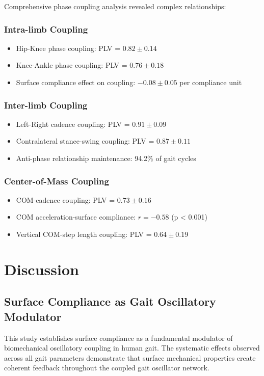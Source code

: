 \documentclass[12pt]{article}
\begin{document}
Comprehensive phase coupling analysis revealed complex relationships:

\subsubsection{Intra-limb Coupling}
\begin{itemize}
\item Hip-Knee phase coupling: PLV = $0.82 \pm 0.14$
\item Knee-Ankle phase coupling: PLV = $0.76 \pm 0.18$
\item Surface compliance effect on coupling: $-0.08 \pm 0.05$ per compliance unit
\end{itemize}

\subsubsection{Inter-limb Coupling}
\begin{itemize}
\item Left-Right cadence coupling: PLV = $0.91 \pm 0.09$
\item Contralateral stance-swing coupling: PLV = $0.87 \pm 0.11$
\item Anti-phase relationship maintenance: 94.2\% of gait cycles
\end{itemize}

\subsubsection{Center-of-Mass Coupling}
\begin{itemize}
\item COM-cadence coupling: PLV = $0.73 \pm 0.16$
\item COM acceleration-surface compliance: $r = -0.58$ (p < 0.001)
\item Vertical COM-step length coupling: PLV = $0.64 \pm 0.19$
\end{itemize}

\section{Discussion}

\subsection{Surface Compliance as Gait Oscillatory Modulator}

This study establishes surface compliance as a fundamental modulator of biomechanical oscillatory coupling in human gait. The systematic effects observed across all gait parameters demonstrate that surface mechanical properties create coherent feedback throughout the coupled gait oscillator network.
\end{document}
